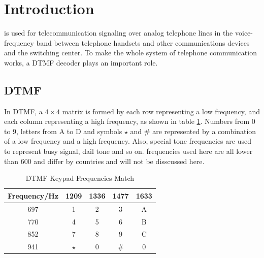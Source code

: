 \documentclass[journal]{./sty/IEEEtran}
\let\MYoriglatexcaption\caption
\renewcommand{\caption}[2][\relax]{\MYoriglatexcaption[#2]{#2}}
\begin{document}
\section{Introduction}
% 
% 
% 
% 
 is used for telecommunication signaling over analog telephone lines in the voice-frequency band between telephone handsets and other communications devices and the switching center. To make the whole system of telephone communication works, a DTMF decoder plays an important role.

\subsection{DTMF}
In DTMF, a $4\times4$ matrix is formed by each row representing a low frequency, and each column representing a high frequency, as shown in table \ref{tab:kpd}. Numbers from 0 to 9, letters from A to D and symbols $\star$ and $\#$ are represented by a combination of a low frequency and a high frequency. Also, special tone frequencies are used to represent busy signal, dail tone and so on. frequencies used here are all lower than 600 and differ by countries and will not be disscussed here. 

\begin{table}[htdp]
\caption{DTMF Keypad Frequencies Match }\label{tab:kpd}
\centering
\begin{tabular}{|c|c|c|c|c|}
\hline Frequency/Hz & 1209 & 1336 & 1477 & 1633 \\
\hline 697 & 1 & 2 & 3 & A \\
\hline 770 & 4 & 5 & 6 & B \\
\hline 852 & 7 & 8 & 9 & C \\
\hline 941 & $\star$ & 0 & $\#$& 0 \\
\hline \end{tabular} 
\end{table}
\end{document}
